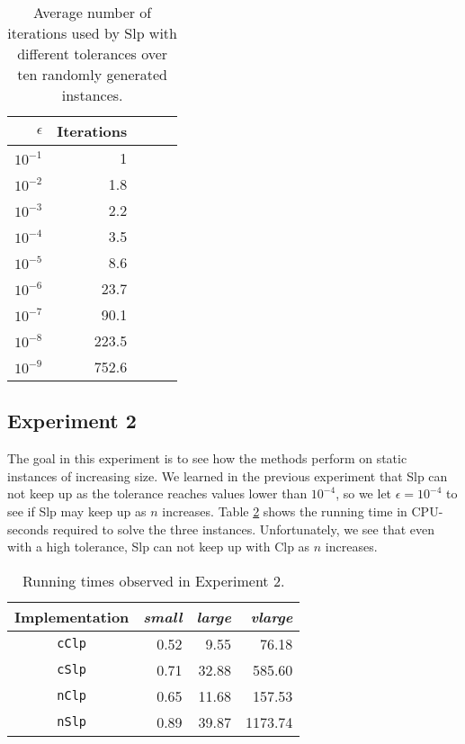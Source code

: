 \begin{table}[ht!]
\centering
\caption{Average number of iterations used by Slp with different tolerances
         over ten randomly generated instances.}
\label{table:expiters}
\begin{tabular}{rrrrr}
$\epsilon$ & Iterations \\ \hline
$10^{-1}$  & 1 \\
$10^{-2}$  & 1.8 \\
$10^{-3}$  & 2.2 \\
$10^{-4}$  & 3.5 \\
$10^{-5}$  & 8.6 \\
$10^{-6}$  & 23.7 \\
$10^{-7}$  & 90.1 \\
$10^{-8}$  & 223.5 \\
$10^{-9}$  & 752.6
\end{tabular}
\end{table}

\subsection*{Experiment 2}
The goal in this experiment is to see how the methods perform on static instances
of increasing size.
We learned in the previous experiment that Slp can not keep up as the tolerance
reaches values lower than $10^{-4}$, so we let $\epsilon = 10^{-4}$ to see if
Slp may keep up as $n$ increases.
Table \ref{table:eps4instances} shows the running time in CPU-seconds required
to solve the three instances.
Unfortunately, we see that even with a high tolerance, Slp can not keep up with
Clp as $n$ increases.

\begin{table}
\centering
\caption{Running times observed in Experiment 2.}
\label{table:eps4instances}
\begin{tabular}{crrr}
\textrm{Implementation} & \textit{small} & \textit{large} & \textit{vlarge} \\ \hline
\texttt{cClp}           & 0.52           & 9.55           & 76.18 \\
\texttt{cSlp}           & 0.71           & 32.88          & 585.60 \\
\texttt{nClp}           & 0.65           & 11.68          & 157.53 \\
\texttt{nSlp}           & 0.89           & 39.87          & 1173.74
\end{tabular}
\end{table}

